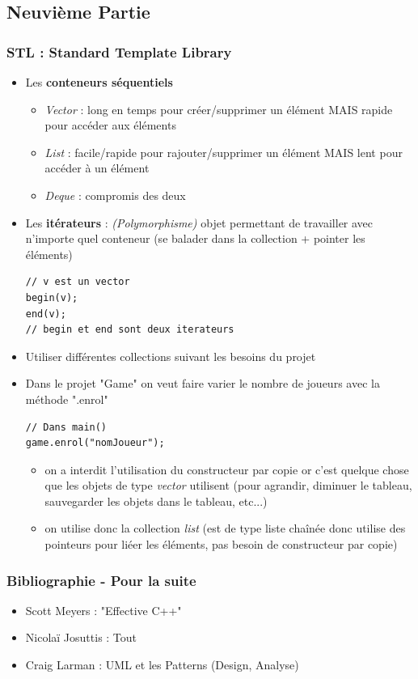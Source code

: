 \documentclass[12pt,a4paper]{article}
\begin{document}
\subsection{Neuvième Partie}
\subsubsection{STL : Standard Template Library}
\begin{itemize}
\item Les \textbf{conteneurs séquentiels}
\begin{itemize}
\item \textit{Vector} : long en temps pour créer/supprimer un élément MAIS rapide pour accéder aux éléments
\item \textit{List} : facile/rapide pour rajouter/supprimer un élément MAIS lent pour accéder à un élément
\item \textit{Deque} : compromis des deux
\end{itemize}
\item Les \textbf{itérateurs} : \textit{(Polymorphisme)} objet permettant de travailler avec n'importe quel conteneur (se balader dans la collection + pointer les éléments)
\begin{lstlisting}
// v est un vector
begin(v);
end(v); 
// begin et end sont deux iterateurs
\end{lstlisting}
\item Utiliser différentes collections suivant les besoins du projet
\item Dans le projet "Game" on veut faire varier le nombre de joueurs avec la méthode ".enrol"
\begin{lstlisting}
// Dans main()
game.enrol("nomJoueur");
\end{lstlisting}
\begin{itemize}
\item on a interdit l'utilisation du constructeur par copie or c'est quelque chose que les objets de type \textit{vector} utilisent (pour agrandir, diminuer le tableau, sauvegarder les objets dans le tableau, etc...)
\item on utilise donc la collection \textit{list} (est de type liste chaînée donc utilise des pointeurs pour liéer les éléments, pas besoin de constructeur par copie)
\end{itemize}
\end{itemize}
\subsubsection{Bibliographie - Pour la suite}
\begin{itemize}
\item Scott Meyers : "Effective C++"
\item Nicolaï Josuttis : Tout
\item Craig Larman : UML et les Patterns (Design, Analyse)
\end{itemize}
\end{document}
